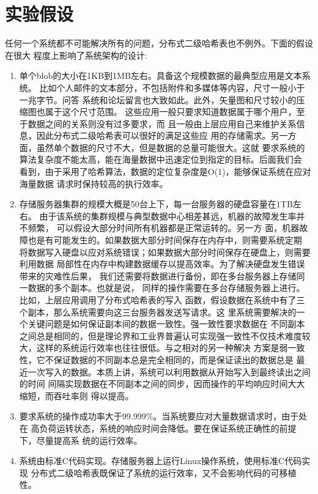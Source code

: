 \section{实验假设}
任何一个系统都不可能解决所有的问题，分布式二级哈希表也不例外。下面的假设在很大
程度上影响了系统架构的设计:
\begin{enumerate}
  \item 单个blob的大小在1KB到1MB左右。具备这个规模数据的最典型应用是文本系统。
  比如个人邮件的文本部分，不包括附件和多媒体等内容，尺寸一般小于一兆字节。问答
  系统和论坛留言也大致如此。此外，矢量图和尺寸较小的压缩图也属于这个尺寸范围。
  这些应用一般只要求知道数据属于哪个用户，至于数据之间的关系则没有过多要求，而
  且一般由上层应用自己来维护关系信息，因此分布式二级哈希表可以很好的满足这些应
  用的存储需求。另一方面，虽然单个数据的尺寸不大，但是数据的总量可能很大。这就
  要求系统的算法复杂度不能太高，能在海量数据中迅速定位到指定的目标。后面我们会
  看到，由于采用了哈希算法，数据的定位复杂度是O(1)，能够保证系统在应对海量数据
  请求时保持较高的执行效率。
  \item 存储服务器集群的规模大概是50台上下，每一台服务器的硬盘容量在1TB左右。
  由于该系统的集群规模与典型数据中心相差甚远，机器的故障发生率并不频繁，
  \cite{hastorun2007dynamo}可以假设大部分时间所有机器都是正常运转的。另一方
  面，机器故障也是有可能发生的。如果数据大部分时间保存在内存中，则需要系统定期
  将数据写入硬盘以应对系统错误；如果数据大部分时间保存在硬盘上，则需要利用数据
  局部性在内存中构建数据缓存以提高效率。为了解决硬盘发生错误带来的灾难性后果，
  我们还需要将数据进行备份，即在多台服务器上存储同一数据的多个副本。也就是说，
  同样的操作需要在多台存储服务器上进行。比如，上层应用调用了分布式哈希表的写入
  函数，假设数据在系统中有了三个副本，那么系统需要向这三台服务器发送写请求。这
  里系统需要解决的一个关键问题是如何保证副本间的数据一致性。强一致性要求数据在
  不同副本之间总是相同的，但是理论界和工业界普遍认可实现强一致性不仅技术难度较
  大，这样的系统运行效率也往往很低。\cite{fox1997cluster}与之相对的另一种解决
  方案是弱一致性，它不保证数据的不同副本总是完全相同的，而是保证读出的数据总是
  最近一次写入的数据。本质上讲，系统可以利用数据从开始写入到最终读出之间的时间
  间隔实现数据在不同副本之间的同步，因而操作的平均响应时间大大缩短，而吞吐率则
  得以提高。
  \item 要求系统的操作成功率大于99.999\%。当系统要应对大量数据请求时，由于处在
  高负荷运转状态，系统的响应时间会降低。要在保证系统正确性的前提下，尽量提高系
  统的运行效率。
  \item 系统由标准C代码实现。存储服务器上运行Linux操作系统，使用标准C代码实现
  分布式二级哈希表既保证了系统的运行效率，又不会影响代码的可移植性。
  
\end{enumerate}

